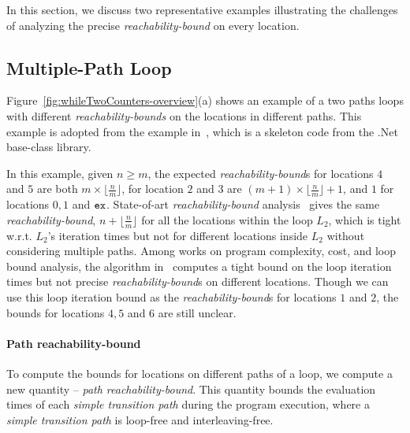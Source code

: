 In this section, we discuss two representative examples illustrating the
challenges of analyzing the precise
\emph{reachability-bound} on
every location.
%
\subsection{Multiple-Path Loop}
\label{sec:overview-multiplepath}

Figure~\ref{fig:whileTwoCounters-overview}(a) shows an example of a two paths loops
with different \emph{reachability-bounds} on the locations in different paths.
This example is adopted from the example in~\cite{GulwaniZ10}, which
is a skeleton code from the .Net base-class library.


In this example, given $n \geq m$,
the expected \emph{reachability-bound}s for locations $4$ and $5$ are both $m \times \lfloor\frac{n}{m}\rfloor$,
for location $2$ and $3$ are $(m + 1) \times \lfloor\frac{n}{m}\rfloor + 1$, 
and $1$ for locations $0, 1$ and $\mathtt{ex}$. 
State-of-art \emph{reachability-bound} analysis~\cite{GulwaniZ10}
gives the same \emph{reachability-bound}, $n + \lfloor\frac{n}{m}\rfloor$ for all the locations within the loop $L_2$, which is tight w.r.t. $L_2$'s iteration times but not for different locations inside $L_2$ without considering multiple paths.
Among works on program complexity, cost, and loop bound analysis, the algorithm in~\cite{GulwaniJK09} computes a tight bound on the loop iteration times but not precise \emph{reachability-bound}s on different locations.
Though we can use this loop iteration bound as the \emph{reachability-bound}s for locations $1$ and $2$,
the bounds for locations $4, 5$ and $6$ are still unclear.


\paragraph{Path reachability-bound}
To compute the bounds for locations on different paths of a loop, we compute a new quantity -- \emph{path reachability-bound}.
This quantity bounds the evaluation times of each \emph{simple transition path} during the program execution, where a \emph{simple transition path} is loop-free and interleaving-free.

